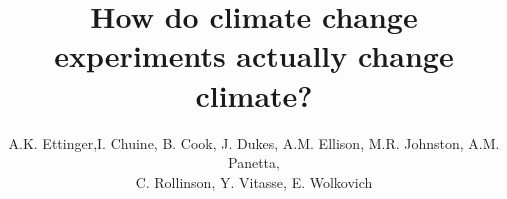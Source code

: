 \documentclass{article}
\begin{document}

\title{How do climate change experiments actually change climate?} %
\author{A.K. Ettinger,I. Chuine, B. Cook, J. Dukes, A.M. Ellison, M.R. Johnston, A.M. Panetta,\\ C. Rollinson, Y. Vitasse, E. Wolkovich}
\maketitle  %

\end{document}
